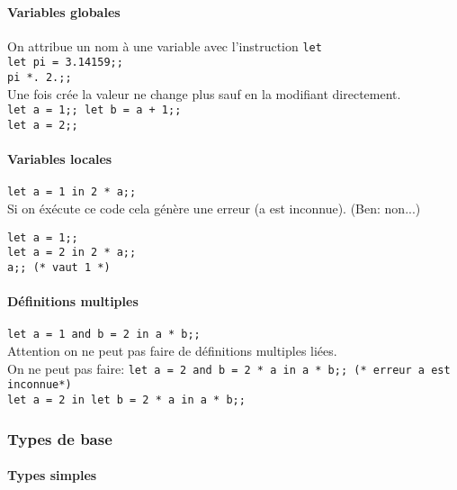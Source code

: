 \documentclass{article}
\newcommand{\code}[1]{\lstinline[style = mystyle]{#1}}
\begin{document}
					\paragraph{Variables globales}
					
						On attribue un nom à une variable avec l'instruction \code{let}\\
						\code{let pi = 3.14159;;}\\
						\code{pi *. 2.;;}\\
						Une fois crée la valeur ne change plus sauf en la modifiant directement.\\
						\code{let a = 1;; let b = a + 1;;}\\
						\code{let a = 2;;}
					
					\paragraph{Variables locales}
					
						\code{let a = 1 in 2 * a;;}\\
						Si on éxécute ce code cela génère une erreur (a est inconnue). (Ben: non...)
						
						\code{let a = 1;;}\\
						\code{let a = 2 in 2 * a;;}\\
						\code{a;; (* vaut 1 *)}

					\paragraph{Définitions multiples}
					
						\code{let a = 1 and b = 2 in a * b;;}\\
						Attention on ne peut pas faire de définitions multiples liées.\\
						On ne peut pas faire: \code{let a = 2 and b = 2 * a in a * b;; (* erreur a est inconnue*)}\\
						\code{let a = 2 in let b = 2 * a in a * b;;}

			\subsubsection{Types de base}
				
					\paragraph{Types simples}
\end{document}
